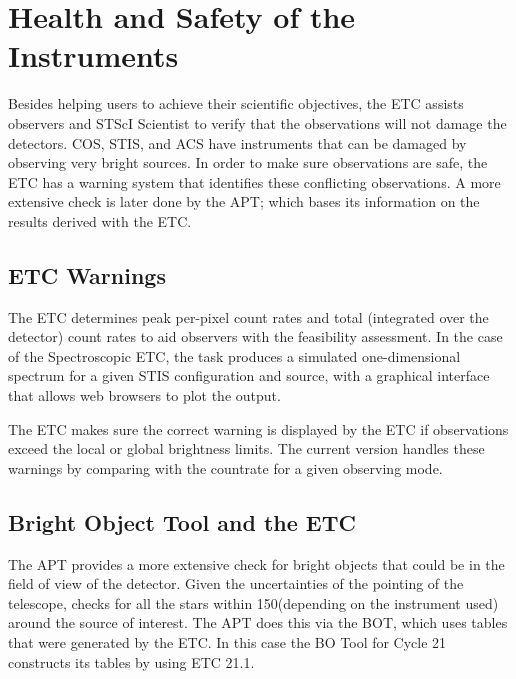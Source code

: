 \section{Health and Safety of the Instruments}

Besides helping users to achieve their scientific objectives, the ETC assists observers and STScI Scientist to verify that the observations will not damage the detectors. COS, STIS, and ACS have instruments that can be damaged  by observing very bright sources. In order to make sure observations are safe, the ETC has a warning system that identifies these conflicting observations. A more extensive check is later done by the APT; which bases its information on the results derived with the ETC.

\subsection{ETC Warnings}

The ETC determines peak per-pixel count rates and total (integrated over the detector) count rates to aid observers with the feasibility assessment. In the case of the Spectroscopic ETC, the task produces a simulated one-dimensional spectrum for a given STIS configuration and source, with a graphical interface that allows web browsers to plot the output.

The ETC makes sure the correct warning is displayed by the ETC if observations exceed the local or global brightness limits. The current version handles these warnings by comparing with the countrate for a given observing mode.


\subsection{Bright Object  Tool and the ETC}

The APT provides a more extensive check for bright objects that could be in the field of view of the detector. Given the uncertainties of the pointing of the telescope, checks for all the stars within 150\arcsec (depending on the instrument used) around the source of interest. The APT does this via the BOT, which uses tables that were generated by the ETC.  In this case the BO Tool for Cycle 21 constructs its tables by using ETC 21.1. 


